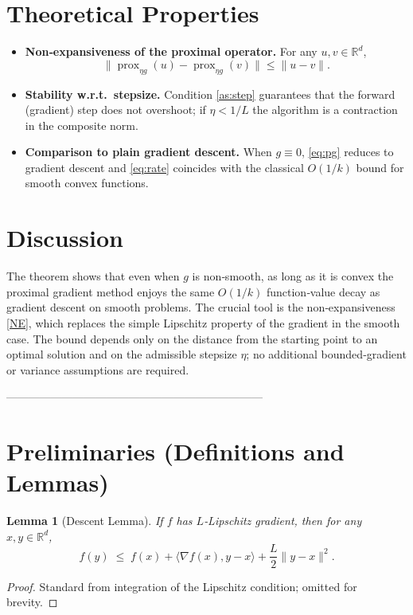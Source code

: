 \documentclass{article}
\newtheorem{lemma}{Lemma}
\newcommand{\prox}{\operatorname{prox}}
\newcommand{\R}{\mathbb{R}}
\begin{document}
\section*{Theoretical Properties}
\begin{itemize}
\item \textbf{Non‑expansiveness of the proximal operator.} For any $u,v\in\R^{d}$,
\[
\|\prox_{\eta g}(u)-\prox_{\eta g}(v)\|\le\|u-v\|.
\tag{NE}
\]
\item \textbf{Stability w.r.t.\ stepsize.} Condition \eqref{as:step} guarantees that the forward (gradient) step does not overshoot; if $\eta<1/L$ the algorithm is a contraction in the composite norm.
\item \textbf{Comparison to plain gradient descent.} When $g\equiv0$, \eqref{eq:pg} reduces to gradient descent and \eqref{eq:rate} coincides with the classical $O(1/k)$ bound for smooth convex functions.
\end{itemize}

\section*{Discussion}
The theorem shows that even when $g$ is non‑smooth, as long as it is convex the proximal gradient method enjoys the same $O(1/k)$ function‑value decay as gradient descent on smooth problems. The crucial tool is the non‑expansiveness \eqref{NE}, which replaces the simple Lipschitz property of the gradient in the smooth case. The bound depends only on the distance from the starting point to an optimal solution and on the admissible stepsize $\eta$; no additional bounded‑gradient or variance assumptions are required.

---------------------------------------------------------------------

\section*{Preliminaries (Definitions and Lemmas)}
\begin{lemma}[Descent Lemma]\label{lem:descent}
If $f$ has $L$‑Lipschitz gradient, then for any $x,y\in\R^{d}$,
\[
f(y)\;\le\;f(x)+\langle\nabla f(x),y-x\rangle+\frac{L}{2}\|y-x\|^{2}.
\tag{DL}
\]
\end{lemma}
\begin{proof}
Standard from integration of the Lipschitz condition; omitted for brevity. \qedhere
\end{proof}
\end{document}
